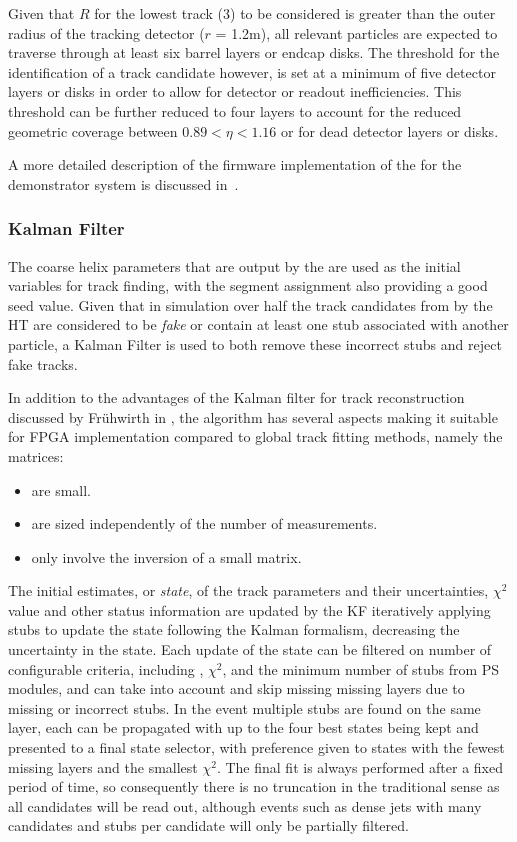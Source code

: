 Given that $R$ for the lowest \pT track (3\GeV) to be considered is greater than the outer radius of the tracking detector ($r$ = 1.2m), all relevant particles are expected to traverse through at least six barrel layers or endcap disks. 
The threshold for the identification of a track candidate however, is set at a minimum of five detector layers or disks in order to allow for detector or readout inefficiencies. 
This threshold can be further reduced to four layers to account for the reduced geometric coverage between $0.89 < \eta < 1.16$ or for dead detector layers or disks.

A more detailed description of the firmware implementation of the \HT for the demonstrator system is discussed in~\cite{TMTT_JINST,IEEE}.

\subsubsection{Kalman Filter}\label{subsubsec:KF}
The coarse \rphi helix parameters that are output by the \HT are used as the initial variables for track finding, with the segment assignment also providing a good seed value.
Given that in simulation over half the track candidates from by the HT are considered to be \textit{fake} or contain at least one stub associated with another particle, a Kalman Filter is used to both remove these incorrect stubs and reject fake tracks. 

In addition to the advantages of the Kalman filter for track reconstruction discussed by Fr{\"u}hwirth in \cite{Fruhwirth:1987fm}, the algorithm has several aspects making it suitable for FPGA implementation compared to global track fitting methods, namely the matrices:

\begin{itemize}
\item {are small.}
\item {are sized independently of the number of measurements.}
\item {only involve the inversion of a small matrix.}
\end{itemize}

The initial estimates, or \textit{state}, of the track parameters and their uncertainties, $\chi^2$ value and other status information are updated by the KF iteratively applying stubs to update the state following the Kalman formalism, decreasing the uncertainty in the state. 
Each update of the state can be filtered on number of configurable criteria, including \pT, $\chi^2$, and the minimum number of stubs from PS modules, and can take into account and skip missing missing layers due to missing or incorrect stubs.
In the event multiple stubs are found on the same layer, each can be propagated with up to the four best states being kept and presented to a final state selector, with preference given to states with the fewest missing layers and the smallest $\chi^2$.
The final fit is always performed after a fixed period of time, so consequently there is no truncation in the traditional sense as all candidates will be read out, although events such as dense jets with many candidates and stubs per candidate will only be partially filtered.

